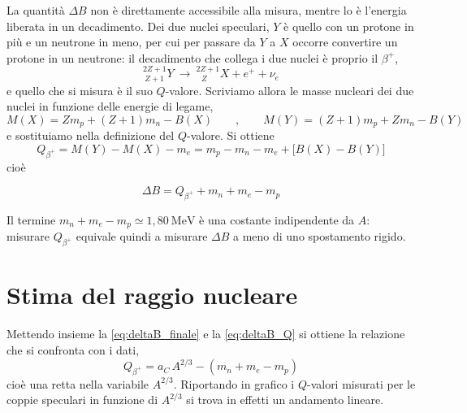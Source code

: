 La quantità $\Delta B$ non è direttamente accessibile alla misura, mentre lo è l'energia liberata in un decadimento. Dei due nuclei speculari, $Y$ è quello con un protone in più e un neutrone in meno, per cui per passare da $Y$ a $X$ occorre convertire un protone in un neutrone: il decadimento che collega i due nuclei è proprio il $\beta^+$,
%
\begin{equation*}
    ^{2Z+1}_{\ Z+1}Y \ \longrightarrow \ ^{2Z+1}_{\ \ \ Z}X + e^+ + \nu_e
\end{equation*}
e quello che si misura è il suo $Q$-valore. Scriviamo allora le masse nucleari dei due nuclei in funzione delle energie di legame,
%
\begin{equation}
    M(X) = Z m_p + (Z+1) m_n - B(X) \qquad , \qquad M(Y) = (Z+1) m_p + Z m_n - B(Y)
    \label{eq:masse_speculari}
\end{equation}
e sostituiamo nella definizione del $Q$-valore. Si ottiene
%
\begin{equation*}
    Q_{\beta^+} = M(Y) - M(X) - m_e = m_p - m_n - m_e + \big[B(X) - B(Y)\big]
\end{equation*}
cioè

\begin{tcolorbox}[colback=black!5!white, colframe=black!45!white, boxrule=0.8pt]
\begin{equation}
    \Delta B = Q_{\beta^+} + m_n + m_e - m_p
    \label{eq:deltaB_Q}
\end{equation}
\end{tcolorbox}
Il termine $m_n + m_e - m_p \simeq 1{,}80 \ \text{MeV}$ è una costante indipendente da $A$: misurare $Q_{\beta^+}$ equivale quindi a misurare $\Delta B$ a meno di uno spostamento rigido.

\section{Stima del raggio nucleare}

Mettendo insieme la \eqref{eq:deltaB_finale} e la \eqref{eq:deltaB_Q} si ottiene la relazione che si confronta con i dati,
%
\begin{equation}
    Q_{\beta^+} = a_C \, A^{2/3} - \left(m_n + m_e - m_p\right)
    \label{eq:retta_speculari}
\end{equation}
cioè una retta nella variabile $A^{2/3}$. Riportando in grafico i $Q$-valori misurati per le coppie speculari in funzione di $A^{2/3}$ si trova in effetti un andamento lineare.

